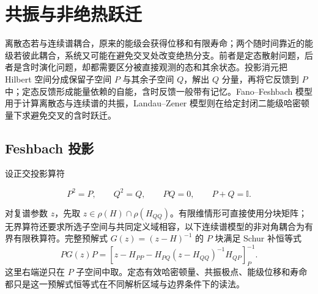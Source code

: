 \chapter{共振与非绝热跃迁}
\label{ch:resonance-lz}

离散态若与连续谱耦合，原来的能级会获得位移和有限寿命；两个随时间靠近的能级若彼此耦合，系统又可能在避免交叉处改变绝热分支。前者是定态散射问题，后者是含时演化问题，却都需要区分被直接观测的态和其余状态。投影消元把 Hilbert 空间分成保留子空间 \(P\) 与其余子空间 \(Q\)，解出 \(Q\) 分量，再将它反馈到 \(P\) 中；定态反馈形成能量依赖的自能，含时反馈一般带有记忆。Fano--Feshbach 模型用于计算离散态与连续谱的共振，Landau--Zener 模型则在给定封闭二能级哈密顿量下求避免交叉的含时跃迁。
\section{Feshbach 投影}

设正交投影算符

\[
P^2=P,
\qquad
Q^2=Q,
\qquad
PQ=0,
\qquad
P+Q=\mathbb I.
\]

对复谱参数 $z$，先取 $z\in\rho(H)\cap\rho(H_{QQ})$。有限维情形可直接使用分块矩阵；无界算符还要求所选子空间与共同定义域相容，以下连续谱模型的非对角耦合为有界有限秩算符。完整预解式 $G(z)=(z-H)^{-1}$ 的 $P$ 块满足 Schur 补恒等式
\begin{equation}
PG(z)P
=\left[z-H_{PP}-H_{PQ}(z-H_{QQ})^{-1}H_{QP}\right]^{-1}_{P}.
\label{eq:feshbach-schur-resolvent}
\end{equation}
这里右端逆只在 $P$ 子空间中取。定态有效哈密顿量、共振极点、能级位移和寿命都只是这一预解式恒等式在不同解析区域与边界条件下的读法。

